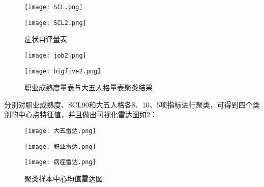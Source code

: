 \documentclass[withoutpreface,bwprint]{cumcmthesis} %
\begin{document}
\begin{figure}
    \centering
    \begin{minipage}[c]{0.48\textwidth}
        \centering
        \texttt{[image: SCL.png]}
    \end{minipage}
    \begin{minipage}[c]{0.48\textwidth}
        \centering
        \texttt{[image: SCL2.png]}
    \end{minipage}
    \caption{症状自评量表}
    \label{fig:cluster1}
\end{figure}


\begin{figure}
    \centering
    \begin{minipage}[c]{0.48\textwidth}
        \centering
        \texttt{[image: job2.png]}
    \end{minipage}
    \begin{minipage}[c]{0.48\textwidth}
        \centering
        \texttt{[image: bigfive2.png]}
    \end{minipage}
    \caption{职业成熟度量表与大五人格量表聚类结果}
\end{figure}

分别对职业成熟度、SCL90和大五人格各8、10、5项指标进行聚类，可得到四个类别的中心点特征值，并且做出可视化雷达图如\cref{fig:rader}：
\begin{figure}
    \centering
    \begin{minipage}[c]{0.3\textwidth}
        \centering
        \texttt{[image: 大五雷达.png]}
        \label{fig:大五雷达}
    \end{minipage}
    \begin{minipage}[c]{0.3\textwidth}
        \centering
        \texttt{[image: 职业雷达.png]}
        \label{fig:职业雷达}
    \end{minipage}
    \begin{minipage}[c]{0.3\textwidth}
        \centering
        \texttt{[image: 病症雷达.png]}
        \label{fig:病症雷达}
    \end{minipage}
    \caption{聚类样本中心均值雷达图}
    \label{fig:rader}
\end{figure}
\end{document}
